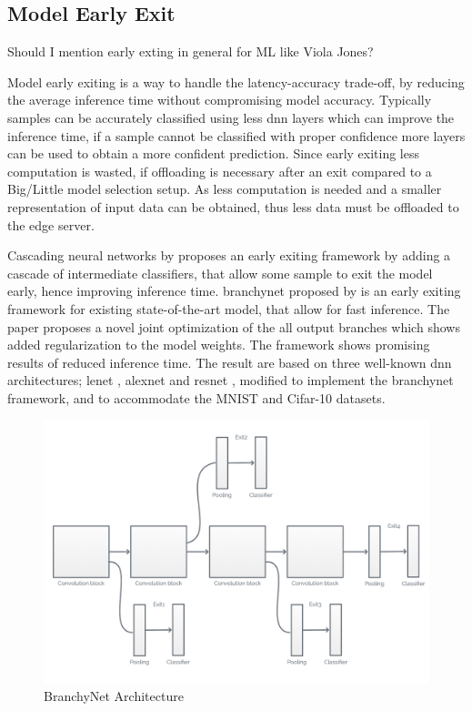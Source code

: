 \subsection{Model Early Exit}

Should I mention early exting in general for ML like Viola Jones? \cite{viola_rapid_2001}

Model early exiting is a way to handle the latency-accuracy trade-off, by reducing the average inference time without compromising model accuracy. Typically samples can be accurately classified using less \gls{dnn} layers which can improve the inference time, if a sample cannot be classified with proper confidence more layers can be used to obtain a more confident prediction. Since early exiting less computation is wasted, if offloading is necessary after an exit compared to a Big/Little model selection setup. As less computation is needed and a smaller representation of input data can be obtained, thus less data must be offloaded to the edge server.

Cascading neural networks \cite{leroux_resource-constrained_2015} by \citeauthor{leroux_resource-constrained_2015} proposes an early exiting framework by adding a cascade of intermediate classifiers, that allow some sample to exit the model early, hence improving inference time. \gls{branchynet} \cite{teerapittayanon_branchynet:_2016} proposed by \citeauthor{teerapittayanon_branchynet:_2016} is an early exiting framework for existing state-of-the-art model, that allow for fast inference. The paper proposes a novel joint optimization of the all output branches which shows added regularization to the model weights. The framework shows promising results of reduced inference time. The result are based on three well-known \gls{dnn} architectures; \gls{lenet} \cite{lecun_lecun-98.pdf_1998}, \gls{alexnet} \cite{krizhevsky_imagenet_2017} and \gls{resnet} \cite{he_deep_2015}, modified to implement the \gls{branchynet} framework, and to accommodate the MNIST \cite{lecun_mnist_2010} and Cifar-10 \cite{krizhevsky_cifar-10_nodate} datasets.

\begin{figure}
	\centering
	\includegraphics[width=\linewidth]{figures/models/branchy}
	\caption[BranchyNet Architecture]{BranchyNet Architecture}
\end{figure}

